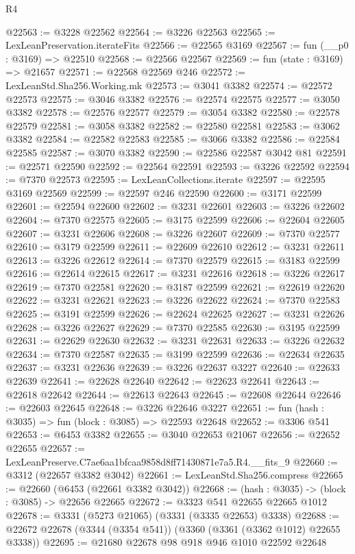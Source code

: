 \begin{lexlean}{R4}
\begin{coremodule}
@22563 := @3228 @22562
@22564 := @3226 @22563
@22565 := LexLeanPreservation.iterateFits
@22566 := @22565 @3169
@22567 := fun (__p0 : @3169) => @22510
@22568 := @22566 @22567
@22569 := fun (state : @3169) => @21657
@22571 := @22568 @22569 @246
@22572 := LexLeanStd.Sha256.Working.mk
@22573 := @3041 @3382
@22574 := @22572 @22573
@22575 := @3046 @3382
@22576 := @22574 @22575
@22577 := @3050 @3382
@22578 := @22576 @22577
@22579 := @3054 @3382
@22580 := @22578 @22579
@22581 := @3058 @3382
@22582 := @22580 @22581
@22583 := @3062 @3382
@22584 := @22582 @22583
@22585 := @3066 @3382
@22586 := @22584 @22585
@22587 := @3070 @3382
@22590 := @22586 @22587 @3042 @81
@22591 := @22571 @22590
@22592 := @22564 @22591
@22593 := @3226 @22592
@22594 := @7370 @22573
@22595 := LexLeanCollections.iterate
@22597 := @22595 @3169 @22569
@22599 := @22597 @246 @22590
@22600 := @3171 @22599
@22601 := @22594 @22600
@22602 := @3231 @22601
@22603 := @3226 @22602
@22604 := @7370 @22575
@22605 := @3175 @22599
@22606 := @22604 @22605
@22607 := @3231 @22606
@22608 := @3226 @22607
@22609 := @7370 @22577
@22610 := @3179 @22599
@22611 := @22609 @22610
@22612 := @3231 @22611
@22613 := @3226 @22612
@22614 := @7370 @22579
@22615 := @3183 @22599
@22616 := @22614 @22615
@22617 := @3231 @22616
@22618 := @3226 @22617
@22619 := @7370 @22581
@22620 := @3187 @22599
@22621 := @22619 @22620
@22622 := @3231 @22621
@22623 := @3226 @22622
@22624 := @7370 @22583
@22625 := @3191 @22599
@22626 := @22624 @22625
@22627 := @3231 @22626
@22628 := @3226 @22627
@22629 := @7370 @22585
@22630 := @3195 @22599
@22631 := @22629 @22630
@22632 := @3231 @22631
@22633 := @3226 @22632
@22634 := @7370 @22587
@22635 := @3199 @22599
@22636 := @22634 @22635
@22637 := @3231 @22636
@22639 := @3226 @22637 @3227
@22640 := @22633 @22639
@22641 := @22628 @22640
@22642 := @22623 @22641
@22643 := @22618 @22642
@22644 := @22613 @22643
@22645 := @22608 @22644
@22646 := @22603 @22645
@22648 := @3226 @22646 @3227
@22651 := fun (hash : @3035) => fun (block : @3085) => @22593 @22648
@22652 := @3306 @541
@22653 := @6453 @3382
@22655 := @3040 @22653 @21067
@22656 := @22652 @22655
@22657 := LexLeanPreserve.C7ae6aa1bfcaa9858d8ff71430871e7a5.R4.__fits_9
@22660 := @3312 (@22657 @3382 @3042)
@22661 := LexLeanStd.Sha256.compress
@22665 := @22660 (@6453 (@22661 @3382 @3042))
@22668 := (hash : @3035) -> (block : @3085) -> @22656 @22665
@22672 := @3323 @541 @22655 @22665 @1012
@22678 := @3331 (@5273 @21065) (@3331 (@3335 @22653) @3338)
@22688 := @22672 @22678 (@3344 (@3354 @541)) (@3360 (@3361 (@3362 @1012) @22655 @3338))
@22695 := @21680 @22678 @98 @918 @946 @1010 @22592 @22648

\end{coremodule}
\end{lexlean}
